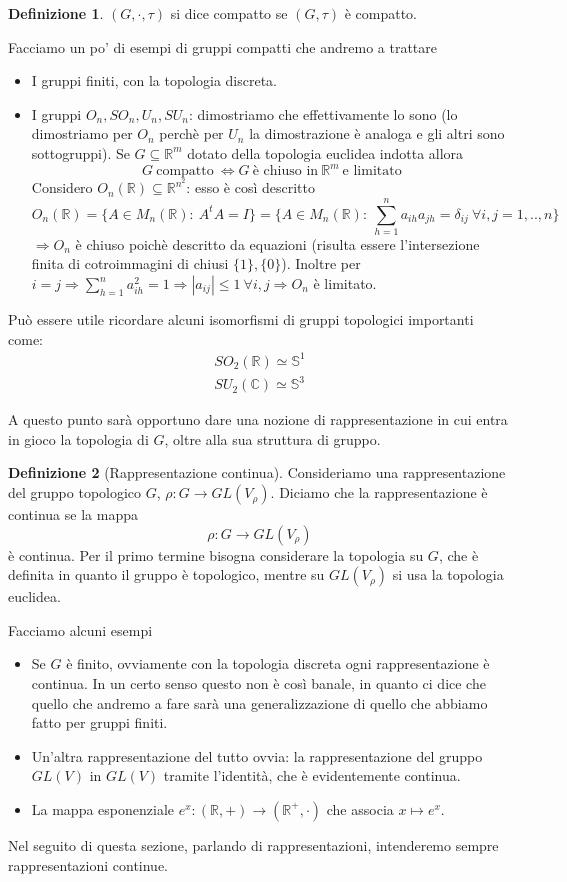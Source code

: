 \documentclass[11pt]{article}
\theoremstyle{plain}
\theoremstyle{definition}
\newtheorem{defn}{Definizione}[section]
\theoremstyle{remark}
\newcommand{\C}{\mathbb{C}}
\newcommand{\R}{\mathbb{R}}
\DeclareMathOperator{\iso}{\simeq}
\begin{document}
\begin{defn}
$(G, \cdot, \tau)$ si dice compatto se $(G, \tau)$ è compatto.
\end{defn}


Facciamo un po' di esempi di gruppi compatti che andremo a trattare
\begin{itemize}
\item I gruppi finiti, con la topologia discreta.
\item I gruppi $O_n, SO_n, U_n, SU_n$: dimostriamo che effettivamente lo sono (lo dimostriamo per $O_n$ perchè per $U_n$ la dimostrazione è analoga e gli altri sono sottogruppi).
Se $G\subseteq \R^m$ dotato della topologia euclidea indotta allora
\[G\ \text{compatto}\ \Leftrightarrow G\ \text{è chiuso in}\ \R^m\ \text{e limitato}\]
Considero $O_n(\R)\subseteq \R^{n^2}$: esso è così descritto
\[O_n(\R)=\{A\in M_n(\R):\ A^tA=I\}=\{A\in M_n(\R):\ \sum_{h=1}^{n}a_{ih}a_{jh}=\delta_{ij}\ \forall i,j=1,..,n\}\]
$\Rightarrow O_n$ è chiuso poichè descritto da equazioni (risulta essere l'intersezione finita di cotroimmagini di chiusi $\{1\},\{0\}$). Inoltre per $i=j\Rightarrow \sum_{h=1}^n a_{ih}^2=1\Rightarrow |a_{ij}|\leq 1\ \forall i,j\Rightarrow O_n$ è limitato.
\end{itemize}

Può essere utile ricordare alcuni isomorfismi di gruppi topologici importanti come:
\begin{align*}
SO_2(\R) \iso \mathbb{S}^1 \\
SU_2(\C) \iso \mathbb{S}^3
\end{align*}

A questo punto sarà opportuno dare una nozione di rappresentazione in cui entra in gioco la topologia di $G$, oltre alla sua struttura di gruppo.
\begin{defn}[Rappresentazione continua]
Consideriamo una rappresentazione del gruppo topologico $G$, $\rho: G \to GL(V_\rho)$. Diciamo che la rappresentazione è continua se la mappa
\[ \rho: G \to GL(V_\rho)\]
è continua. Per il primo termine bisogna considerare la topologia su $G$, che è definita in quanto il gruppo è topologico, mentre su $GL(V_\rho)$ si usa la topologia euclidea.
\end{defn}

Facciamo alcuni esempi
\begin{itemize}
\item Se $G$ è finito, ovviamente con la topologia discreta ogni rappresentazione è continua. In un certo senso questo non è così banale, in quanto ci dice che quello che andremo a fare sarà una generalizzazione di quello che abbiamo fatto per gruppi finiti.
\item Un'altra rappresentazione del tutto ovvia: la rappresentazione del gruppo $GL(V)$ in $GL(V)$ tramite l'identità, che è evidentemente continua.
\item La mappa esponenziale $e^x: (\R, +) \to (\R^+, \cdot )$ che associa $x\mapsto e^x$.
\end{itemize}
Nel seguito di questa sezione, parlando di rappresentazioni, intenderemo sempre rappresentazioni continue.
\end{document}
